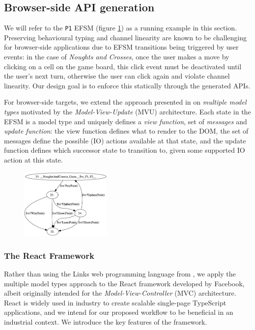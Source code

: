 \documentclass[submission,copyright,creativecommons]{eptcs}
\begin{document}
\subsection{Browser-side API generation}
\label{section:browser}

We will refer to the \texttt{P1} EFSM (figure \ref{fig:efsmp1}) as a
running example in this section. Preserving behavioural typing and
channel linearity are known to be challenging for browser-side
applications due to EFSM transitions being triggered by user events: 
in the case of \textit{Noughts and Crosses}, once the user makes a move
by clicking on a cell on the game board, this click event must be
deactivated until the user's next turn, otherwise the user can click
again and violate channel linearity. Our design goal is to enforce
this statically through the generated APIs. 

For browser-side targets, we extend the approach presented in \cite{MVU2019} on \textit{multiple model types} motivated by the \textit{Model-View-Update} (MVU) architecture. Each state in the EFSM is a model type and uniquely defines a \textit{view function}, set of \textit{messages} and \textit{update function}: the view function defines what to render to the DOM, the set of messages define the possible (IO) actions available at that state, and the update function defines which successor state to transition to, given some supported IO action at this state.

\begin{figure}
  \begin{center}
    \includegraphics[width=0.4\textwidth]{figures/efsm_p1.png}
  \end{center}

  \label{fig:efsmp1}
\end{figure}

\subsubsection{The React Framework}
Rather than using the Links web programming language from \cite{MVU2019}, we apply the multiple model types approach to the React framework \cite{React} developed by Facebook, albeit originally intended for the \textit{Model-View-Controller} (MVC) architecture. React is widely used in industry to create scalable single-page TypeScript applications, and we intend for our proposed workflow to be beneficial in an industrial context. We introduce the key features of the framework.
\end{document}
